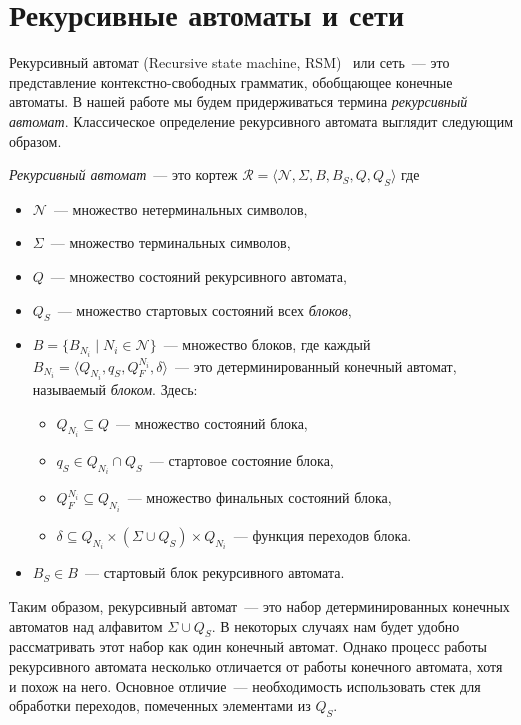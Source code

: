 \section{Рекурсивные автоматы и сети}
\label{sec:RecursiveAutomata}

Рекурсивный автомат (Recursive state machine, RSM)~ или сеть~--- это представление контекстно-свободных грамматик, обобщающее конечные автоматы.
В нашей работе мы будем придерживаться термина \emph{рекурсивный автомат}.
Классическое определение рекурсивного автомата выглядит следующим образом.

\begin{definition}
    \emph{Рекурсивный автомат}~--- это кортеж $\mathcal{R} = \langle \mathcal{N},\Sigma,B,B_S,Q,Q_S\rangle$ где
    \begin{itemize}
        \item $\mathcal{N}$~--- множество нетерминальных символов,
        \item $\Sigma$~--- множество терминальных символов,
        \item $Q$~--- множество состояний рекурсивного автомата,
        \item $Q_S$~--- множество стартовых состояний всех \emph{блоков},
        \item $B=\{B_{N_i} \mid N_i \in \mathcal{N}\}$~--- множество блоков, где каждый \\ $B_{N_i} = \langle Q_{N_i}, q_S, Q_F^{N_i}, \delta \rangle$~--- это детерминированный конечный автомат, называемый \emph{блоком}.
              Здесь:
              \begin{itemize}
                  \item $Q_{N_i} \subseteq Q$~--- множество состояний блока,
                  \item $q_S \in Q_{N_i} \cap Q_S$~--- стартовое состояние блока,
                  \item $Q_F^{N_i} \subseteq Q_{N_i}$~--- множество финальных состояний блока,
                  \item $\delta \subseteq Q_{N_i} \times  (\Sigma\cup Q_S) \times Q_{N_i}$~--- функция переходов блока.
              \end{itemize}
        \item $B_S \in B$~--- стартовый блок рекурсивного автомата.
    \end{itemize}
\end{definition}

Таким образом, рекурсивный автомат~--- это набор детерминированных конечных автоматов над алфавитом $\Sigma \cup Q_S$.
В некоторых случаях нам будет удобно рассматривать этот набор как один конечный автомат.
Однако процесс работы рекурсивного автомата несколько отличается от работы конечного автомата, хотя и похож на него.
Основное отличие~--- необходимость использовать стек для обработки переходов, помеченных элементами из $Q_S$.

